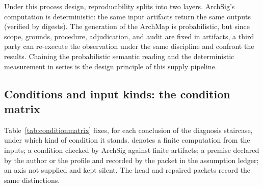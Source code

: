 Under this process design, reproducibility splits into two layers.
ArchSig's computation is deterministic: the same input artifacts
return the same outputs (verified by digests). The generation of the
ArchMap is probabilistic, but since scope, grounds, procedure,
adjudication, and audit are fixed in artifacts, a third party can
re-execute the observation under the same discipline and confront the
results. Chaining the probabilistic semantic reading and the
deterministic measurement in series is the design principle of this
supply pipeline.

\subsection{Conditions and input kinds: the condition matrix}\label{app:C3}

Table~\ref{tab:conditionmatrix} fixes, for each conclusion of the
diagnosis staircase, under which kind of condition it stands. 
denotes a finite computation from the inputs;  a
condition checked by ArchSig against finite artifacts; 
a premise declared by the author or the profile and recorded by the
packet in the assumption ledger;  an axis not
supplied and kept silent. The head and repaired packets record the
same distinctions.

